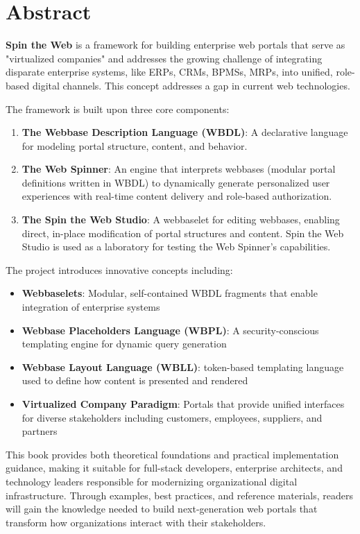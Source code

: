 
\chapter*{Abstract}

\textbf{Spin the Web} is a framework for building enterprise web portals that serve as "virtualized companies" and addresses the growing challenge of integrating disparate enterprise systems, like ERPs, CRMs, BPMSs, MRPs, into unified, role-based digital channels. This concept addresses a gap in current web technologies.

The framework is built upon three core components:

\begin{enumerate}
\item \textbf{The Webbase Description Language (WBDL)}: A declarative language for modeling portal structure, content, and behavior.
\item \textbf{The Web Spinner}: An engine that interprets webbases (modular portal definitions written in WBDL) to dynamically generate personalized user experiences with real-time content delivery and role-based authorization.
\item \textbf{The Spin the Web Studio}: A webbaselet for editing webbases, enabling direct, in-place modification of portal structures and content. Spin the Web Studio is used as a laboratory for testing the Web Spinner's capabilities.
\end{enumerate}

The project introduces innovative concepts including:
\begin{itemize}
\item \textbf{Webbaselets}: Modular, self-contained WBDL fragments that enable integration of enterprise systems
\item \textbf{Webbase Placeholders Language (WBPL)}: A security-conscious templating engine for dynamic query generation
\item \textbf{Webbase Layout Language (WBLL)}: token-based templating language used to define how content is presented and rendered
\item \textbf{Virtualized Company Paradigm}: Portals that provide unified interfaces for diverse stakeholders including customers, employees, suppliers, and partners
\end{itemize}

This book provides both theoretical foundations and practical implementation guidance, making it suitable for full-stack developers, enterprise architects, and technology leaders responsible for modernizing organizational digital infrastructure. Through examples, best practices, and reference materials, readers will gain the knowledge needed to build next-generation web portals that transform how organizations interact with their stakeholders.

